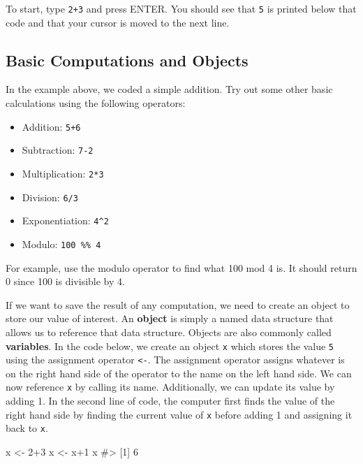 \documentclass[
  letterpaper,
]{krantz}
\makeatletter
\newenvironment{Shaded}{\begin{snugshade}}{\end{snugshade}}
\newcommand{\CommentTok}[1]{\textcolor[rgb]{0.37,0.37,0.37}{#1}}
\newcommand{\DecValTok}[1]{\textcolor[rgb]{0.68,0.00,0.00}{#1}}
\newcommand{\NormalTok}[1]{\textcolor[rgb]{0.00,0.23,0.31}{#1}}
\newcommand{\OtherTok}[1]{\textcolor[rgb]{0.00,0.23,0.31}{#1}}
\newcommand{\SpecialCharTok}[1]{\textcolor[rgb]{0.37,0.37,0.37}{#1}}
\providecommand{\tightlist}{%
  \setlength{\itemsep}{0pt}\setlength{\parskip}{0pt}}\usepackage{longtable,booktabs,array}
\newenvironment{kframe}{%
\medskip{}
\setlength{\fboxsep}{.8em}
 \def\at@end@of@kframe{}%
 \ifinner\ifhmode%
  \def\at@end@of@kframe{\end{minipage}}%
  \begin{minipage}{\columnwidth}%
 \fi\fi%
 \def\FrameCommand##1{\hskip\@totalleftmargin \hskip-\fboxsep
 \colorbox{shadecolor}{##1}\hskip-\fboxsep
     \hskip-\linewidth \hskip-\@totalleftmargin \hskip\columnwidth}%
 \MakeFramed {\advance\hsize-\width
   \@totalleftmargin\z@ \linewidth\hsize
   \@setminipage}}%
 {\par\unskip\endMakeFramed%
 \at@end@of@kframe}
\renewenvironment{Shaded}{\begin{kframe}}{\end{kframe}}
\makeatother
\begin{document}
To start, type \texttt{2+3} and press ENTER. You should see that
\texttt{5} is printed below that code and that your cursor is moved to
the next line.

\subsection{Basic Computations and
Objects}\label{basic-computations-and-objects}

In the example above, we coded a simple addition. Try out some other
basic calculations using the following operators:

\begin{itemize}
\tightlist
\item
  Addition: \texttt{5+6}\\
\item
  Subtraction: \texttt{7-2}\\
\item
  Multiplication: \texttt{2*3}\\
\item
  Division: \texttt{6/3}\\
\item
  Exponentiation: \texttt{4\^{}2}\\
\item
  Modulo: \texttt{100\ \%\%\ 4}
\end{itemize}

For example, use the modulo operator to find what 100 mod 4 is. It
should return 0 since 100 is divisible by 4.

If we want to save the result of any computation, we need to create an
object to store our value of interest. An \textbf{object} is simply a
named data structure that allows us to reference that data structure.
Objects are also commonly called \textbf{variables}. In the code below,
we create an object \texttt{x} which stores the value \texttt{5} using
the assignment operator \texttt{\textless{}-}. The assignment operator
assigns whatever is on the right hand side of the operator to the name
on the left hand side. We can now reference \texttt{x} by calling its
name. Additionally, we can update its value by adding 1. In the second
line of code, the computer first finds the value of the right hand side
by finding the current value of \texttt{x} before adding 1 and assigning
it back to \texttt{x}.

\begin{Shaded}
\begin{Highlighting}[]
\NormalTok{x }\OtherTok{\textless{}{-}} \DecValTok{2}\SpecialCharTok{+}\DecValTok{3}
\NormalTok{x }\OtherTok{\textless{}{-}}\NormalTok{ x}\SpecialCharTok{+}\DecValTok{1}
\NormalTok{x}
\CommentTok{\#\textgreater{} [1] 6}
\end{Highlighting}
\end{Shaded}
\end{document}
